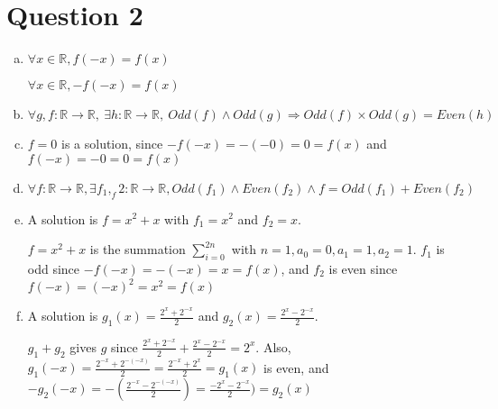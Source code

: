 \documentclass[12pt]{article}
\begin{document}
\section*{Question 2}
\begin{enumerate}[a.]
    \item
    $\forall x \in \mathbb{R}, f(-x) = f(x)$

    $\forall x \in \mathbb{R}, -f(-x) = f(x)$

    \item

    $\forall g,f:\mathbb{R} \to \mathbb{R},\:\exists h:\mathbb{R} \to \mathbb{R},\:Odd(f) \land Odd(g) \Rightarrow Odd(f) \times Odd(g) = Even(h)$

    \item

    $f = 0$ is a solution, since $-f(-x) = -(-0) = 0 = f(x)$ and $f(-x) = -0 = 0 = f(x)$

    \item

    $\forall f: \mathbb{R} \to \mathbb{R}, \exists f_1, _f2:\mathbb{R} \to \mathbb{R}, Odd(f_1) \land Even(f_2) \land f = Odd(f_1) + Even(f_2)$

    \item

    A solution is $f = x^2 + x$ with $f_1 = x^2$ and $f_2 = x$.

    $f = x^2 + x$ is the summation $\sum\limits_{i=0}^{2n}$ with $n = 1, a_0 = 0, a_1 = 1, a_2 = 1$.
    $f_1$ is odd since $-f(-x) = -(-x) = x = f(x)$, and $f_2$ is even since $f(-x) = (-x)^2 = x^2 = f(x)$

    \item

    A solution is $g_1(x) = \frac{2^x + 2^{-x}}{2}$ and $g_2(x) = \frac{2^{x} - 2^{-x}}{2}$.

    $g_1 + g_2$ gives $g$ since $\frac{2^x + 2^{-x}}{2} + \frac{2^{x} - 2^{-x}}{2} = 2^x$.
    Also, $g_1(-x) = \frac{2^{-x} + 2^{-(-x)}}{2} = \frac{2^{-x} + 2^{x}}{2} = g_1(x)$ is even, and
    $-g_2(-x) = -(\frac{2^{-x} - 2^{-(-x)}}{2}) = \frac{-2^{x} - 2^{-x}}{2}) = g_2(x)$


\end{enumerate}
\end{document}
